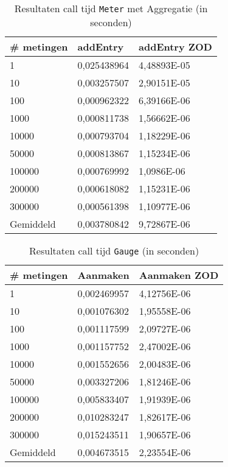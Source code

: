\begin{table}[]
\centering
\begin{tabular}{|l|l|l|}
\hline
\# metingen & addEntry    & addEntry ZOD \\ \hline
1           & 0,025438964 & 4,48893E-05  \\ \hline
10          & 0,003257507 & 2,90151E-05  \\ \hline
100         & 0,000962322 & 6,39166E-06  \\ \hline
1000        & 0,000811738 & 1,56662E-06  \\ \hline
10000       & 0,000793704 & 1,18229E-06  \\ \hline
50000       & 0,000813867 & 1,15234E-06  \\ \hline
100000      & 0,000769992 & 1,0986E-06   \\ \hline
200000      & 0,000618082 & 1,15231E-06  \\ \hline
300000      & 0,000561398 & 1,10977E-06  \\ \hline
Gemiddeld   & 0,003780842 & 9,72867E-06  \\ \hline
\end{tabular}
\caption{Resultaten call tijd \texttt{Meter} met Aggregatie (in seconden)}
\label{Table:MeterAggregate}
\end{table}

\begin{table}[]
\centering
\begin{tabular}{|l|l|l|}
\hline
\# metingen & Aanmaken    & Aanmaken ZOD \\ \hline
1           & 0,002469957 & 4,12756E-06  \\ \hline
10          & 0,001076302 & 1,95558E-06  \\ \hline
100         & 0,001117599 & 2,09727E-06  \\ \hline
1000        & 0,001157752 & 2,47002E-06  \\ \hline
10000       & 0,001552656 & 2,00483E-06  \\ \hline
50000       & 0,003327206 & 1,81246E-06  \\ \hline
100000      & 0,005833407 & 1,91939E-06  \\ \hline
200000      & 0,010283247 & 1,82617E-06  \\ \hline
300000      & 0,015243511 & 1,90657E-06  \\ \hline
Gemiddeld   & 0,004673515 & 2,23554E-06  \\ \hline
\end{tabular}
\caption{Resultaten call tijd \texttt{Gauge} (in seconden)}
\label{Table:Gauge}
\end{table}

